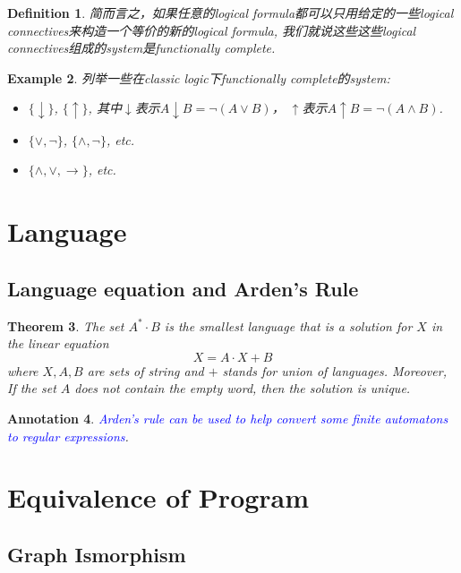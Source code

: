 \documentclass{article}
\newtheorem{theorem}{Theorem}[section]
\newtheorem{example}[theorem]{Example}
\newtheorem{definition}[theorem]{Definition}
\newtheorem{annotation}[theorem]{Annotation}
\newcommand{\bluet}[1]{\textcolor{blue}{#1}}
\begin{document}
\begin{definition}
\rm 简而言之，如果任意的logical formula都可以只用给定的一些logical connectives来构造一个等价的新的logical formula, 我们就说这些这些logical connectives组成的system是functionally complete. 
\end{definition}

\begin{example}
\rm 列举一些在classic logic下functionally complete的system:
\begin{itemize}
	\item $\{\downarrow\}$, $\{\uparrow\}$, 其中$\downarrow$表示$A \downarrow B = \neg (A \vee B)$， $\uparrow$表示$A \uparrow B = \neg (A \wedge B)$.
	\item $\{\vee ,\neg \}$, $\{\wedge ,\neg \}$, etc.
	\item $\{\land ,\lor ,\rightarrow \}$, etc.
\end{itemize}
\end{example}

\section{Language}

\subsection{Language equation and Arden's Rule}

\begin{theorem}
\rm The set $A^* \cdot B$ is the smallest language that is a solution for $X$ in the linear equation 
\[
	X = A \cdot X + B
\]
where $X, A, B$ are sets of string and $+$ stands for union of languages. Moreover, If the set $A$ does not contain the empty word, then the solution is unique.
\end{theorem}

\begin{annotation}
\rm \bluet{Arden's rule can be used to help convert some finite automatons to regular expressions}.
\end{annotation}



\newpage
\section{Equivalence of Program}

\subsection{Graph Ismorphism}
\end{document}
